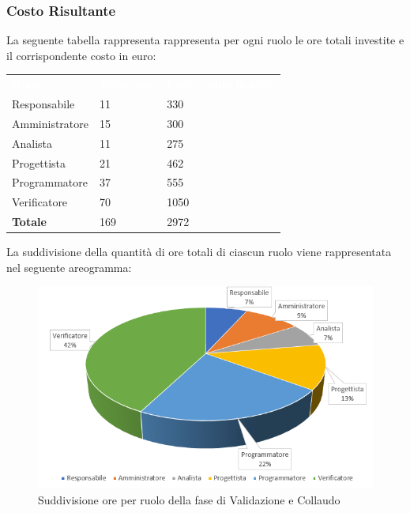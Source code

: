 \subsubsection{Costo Risultante}
La seguente tabella rappresenta rappresenta per ogni ruolo le ore totali investite e il corrispondente costo in euro:
{
	\renewcommand{\arraystretch}{2}
\begin{table}[h!]
	\caption{Tabella del costo risultante di Validazione e Collaudo}
	\begin{longtable}	{ C{3cm} C{2cm} C{4cm}}

		\textcolor{white}{\textbf{Ruolo}} & \textcolor{white}{\textbf{Totale ore}} & \textcolor{white}{\textbf{Costo ruolo in euro}}\\	
        
        Responsabile & 11 & 330\\
        Amministratore & 15 & 300 \\
        Analista & 11 & 275\\
        Progettista & 21 & 462\\
        Programmatore & 37 & 555\\
        Verificatore & 70 & 1050\\
        \textbf{Totale} & 169 & 2972\
	
	\end{longtable}
\end{table}
	
}

La suddivisione della quantità di ore totali di ciascun ruolo viene rappresentata nel seguente areogramma:

\begin{figure}[h]
	\centering
	\caption{Suddivisione ore per ruolo della fase di Validazione e Collaudo}
	\includegraphics[scale=2.5]{sezioni/Aerogrammi/AerogrammaValidazione.png}
\end{figure}


